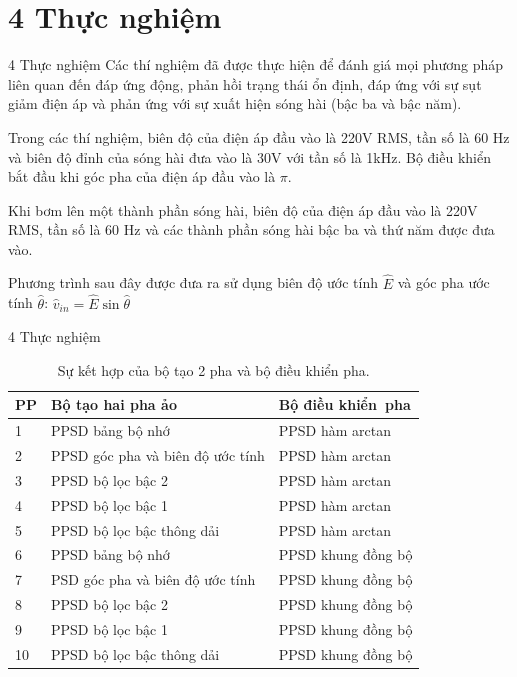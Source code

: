 \documentclass[11pt]{beamer}
\renewcommand{\label}[1]{%
			\gdef\sfname{sf:##1}}%
\begin{document}
\section{4 Thực nghiệm}
	\begin{frame}[t]{4 Thực nghiệm}
		Các thí nghiệm đã được thực hiện để đánh giá mọi phương pháp liên quan đến đáp ứng động, phản hồi trạng thái ổn định, đáp ứng với sự sụt giảm điện áp và phản ứng với sự xuất hiện sóng hài (bậc ba và bậc năm).
		
		Trong các thí nghiệm, biên độ của điện áp đầu vào là 220V RMS, tần số là 60 Hz và biên độ đỉnh của sóng hài đưa vào là 30V với tần số là 1kHz. Bộ điều khiển bắt đầu khi góc pha của điện áp đầu vào là $\pi$.
		
		Khi bơm lên một thành phần sóng hài, biên độ của điện áp đầu vào là 220V RMS, tần số là 60 Hz và các thành phần sóng hài bậc ba và thứ năm được đưa vào.
		
		Phương trình sau đây được đưa ra sử dụng biên độ ước tính $\hat{E}$ và góc pha ước tính $\hat{\theta}$:	
		$\hat{v}_{in} = \hat{E}\sin{\hat{\theta}} $
		
	\end{frame}

\begin{frame}[t]{4 Thực nghiệm}
	\begin{table}
		\begin{tabular}{lll}
			\toprule
			PP & Bộ tạo hai pha ảo & Bộ điều khiển pha   \\
			\midrule
			1	& PPSD bảng bộ nhớ		& PPSD hàm arctan \\
			2	& PPSD góc pha và biên độ ước tính  & PPSD hàm arctan  \\
			3   & PPSD bộ lọc bậc 2 & PPSD hàm arctan  \\
			4	& PPSD bộ lọc bậc 1  & PPSD hàm arctan \\
			5	& PPSD bộ lọc bậc thông dải  & PPSD hàm arctan \\
			6	& PPSD bảng bộ nhớ  & PPSD khung đồng bộ \\
			7	& PSD góc pha và biên độ ước tính  & PPSD khung đồng bộ \\
			8	& PPSD bộ lọc bậc 2  & PPSD khung đồng bộ \\
			9	& PPSD bộ lọc bậc 1  & PPSD khung đồng bộ \\
			10	& PPSD bộ lọc bậc thông dải  & PPSD khung đồng bộ \\
			\bottomrule
		\end{tabular}
		\caption{\label{tab:table-1}Sự kết hợp của bộ tạo 2 pha và bộ điều khiển pha.}
	\end{table}	
	
\end{frame}
\end{document}
